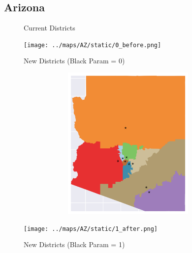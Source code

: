 \subsection{Arizona}
\begin{figure}[htb!] \centering
\caption{ Current Districts }
\texttt{[image: ../maps/AZ/static/0\_before.png]}
\caption{ New Districts (Black Param = 0) }
\includegraphics[width=5in,height=3in,keepaspectratio]{../maps/AZ/static/0_after.png}
\caption{ New Districts (Black Param = 1) }
\texttt{[image: ../maps/AZ/static/1\_after.png]}
\end{figure}

\clearpage
\newpage

